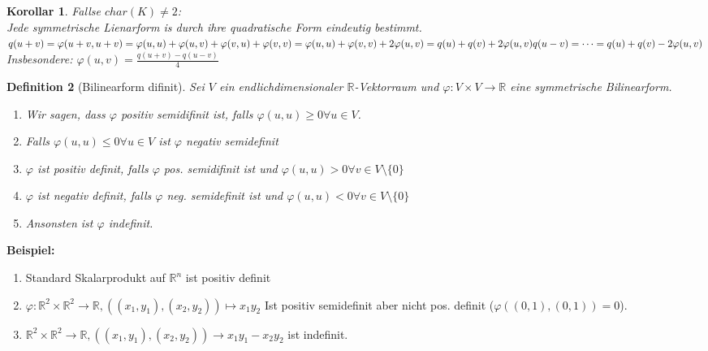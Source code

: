 \documentclass{report}
\newcommand{\R}{\mathbb{R}}
\newenvironment{beispiel} {
\textbf{Beispiel:}\hfill\break
}{}
\theoremstyle{customrem}
\theoremstyle{customdef}
\newtheorem{definition}{Definition}[chapter]
\newtheorem{korrolar}[definition]{Korollar}
\theoremstyle{customenv}
\begin{document}
\begin{korrolar}
  Fallse \(char(K) \neq 2\):\\
  Jede symmetrische Lienarform is durch ihre quadratische Form eindeutig
  bestimmt.\\
  \(
  q(u + v) = \varphi(u+v, u+v) = \varphi(u, u) + \varphi(u, v) + \varphi(v, u)
  + \varphi(v, v) = \varphi(u, u) + \varphi(v, v)  + 2 \varphi(u, v)
  = q(u) + q(v) + 2 \varphi(u, v)\\
  q(u - v) = \dots = q(u) + q(v) - 2 \varphi(u, v)
  \)\\
  Insbesondere: \(\varphi(u, v) = \frac{q(u+v) - q(u - v)}{4}\)
\end{korrolar}

\begin{definition}[Bilinearform difinit]
  Sei \(V\) ein endlichdimensionaler \(\R\)-Vektorraum und
  \(\varphi : V \times V \to \R\) eine symmetrische  Bilinearform.\\
  \begin{enumerate}
    \item {
      Wir sagen, dass \(\varphi\) positiv semidifinit ist, falls
      \(\varphi(u, u) \ge 0 \forall u \in V\).\\
    }
    \item {
      Falls \(\varphi(u, u) \le 0 \forall u \in V\) ist \(\varphi\) negativ
      semidefinit\\
    }
    \item {
      \(\varphi\) ist positiv definit, falls \(\varphi\) pos. semidifinit ist und
      \(\varphi(u, u) > 0 \forall v \in V \setminus \{0\}\)\\
    }
    \item {
      \(\varphi\) ist negativ definit, falls \(\varphi\) neg. semidefinit ist und
      \(\varphi(u, u) < 0 \forall v \in V \setminus \{0\}\)\\
    }
    \item {
      Ansonsten ist \(\varphi\) indefinit.
    }
  \end{enumerate}
\end{definition}

\begin{beispiel}
  \begin{enumerate}
    \item {
      Standard Skalarprodukt auf \(\R^n\) ist positiv definit
    }
    \item {
      \(\varphi : \R^2 \times \R^2 \to \R,
      ((x_1, y_1), (x_2, y_2)) \mapsto x_1 y_2\)
      Ist positiv semidefinit aber nicht pos. definit (\(\varphi((0, 1), (0, 1))
       = 0\)).
    }
    \item {
      \(\R^2 \times \R^2 \to \R,
      ((x_1, y_1), (x_2, y_2)) \to x_1 y_1 - x_2 y_2\) ist indefinit.
    }
  \end{enumerate}
\end{beispiel}
\end{document}
